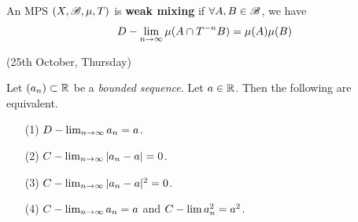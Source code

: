 \documentclass[12pt,a4paper]{report}
\begin{document}
 An MPS $(X,\mathscr{B}, \mu, T)$ is \textbf{weak mixing} if $\forall A,B \in \mathscr{B}$, we have
\begin{align*}
D-\lim_{n\rightarrow \infty} \mu(A \cap T^{-n}B) = \mu(A) \mu(B)
\end{align*}
\s

\newday

(25th October, Thursday)
\s

\lem Let $(a_n) \subset \mathbb{R}$ be a \emph{bounded sequence}. Let $a\in \mathbb{R}$. Then the following are equivalent.
\begin{itemize}
\item[(1)] $D-\lim_{n\rightarrow \infty} a_n =a$.
\item[(2)] $C-\lim_{n\rightarrow \infty} |a_n -a| =0$.
\item[(3)] $C-\lim_{n\rightarrow \infty} |a_n -a|^2 =0$.
\item[(4)] $C-\lim_{n\rightarrow \infty} a_n =a$ and $C-\lim a_n^2 =a^2$.
\end{itemize}
\end{document}
